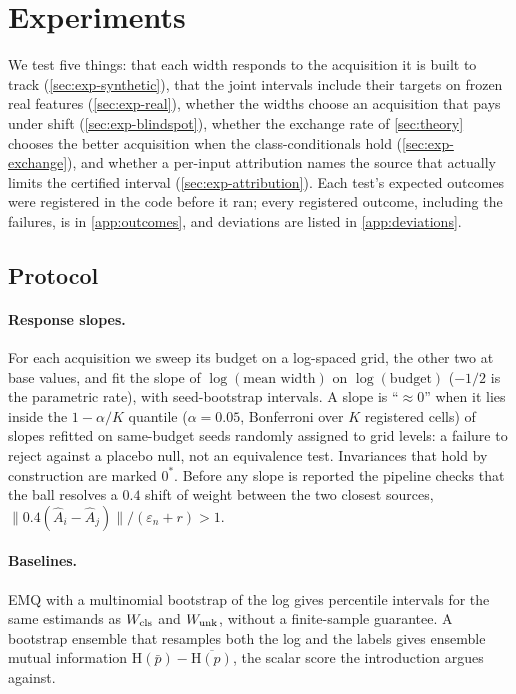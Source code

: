 \section{Experiments}
\label{sec:experiments}

We test five things: that each width responds to the acquisition it is built to track
(\cref{sec:exp-synthetic}), that the joint intervals include their targets on frozen real features
(\cref{sec:exp-real}), whether the widths choose an acquisition that pays under shift
(\cref{sec:exp-blindspot}), whether the exchange rate of \cref{sec:theory} chooses the better
acquisition when the class-conditionals hold (\cref{sec:exp-exchange}), and whether a per-input
attribution names the source that actually limits the certified interval (\cref{sec:exp-attribution}).
Each test's expected outcomes were registered in the code before it ran; every registered outcome,
including the failures, is in \cref{app:outcomes}, and deviations are listed in \cref{app:deviations}.

\subsection{Protocol}
\label{sec:exp-protocol}

\paragraph{Response slopes.} For each acquisition we sweep its budget on a log-spaced grid, the other two at
base values, and fit the slope of $\log(\text{mean width})$ on $\log(\text{budget})$ ($-1/2$ is the parametric
rate), with seed-bootstrap intervals. A slope is ``$\approx0$'' when it lies inside the $1-\alpha/K$ quantile
($\alpha=0.05$, Bonferroni over $K$ registered cells) of slopes refitted on same-budget seeds randomly assigned to
grid levels: a failure to reject against a placebo null, not an equivalence test. Invariances that hold by
construction are marked $0^{\ast}$. Before any slope is reported the pipeline checks that the ball resolves a
$0.4$ shift of weight between the two closest sources, $\lVert0.4(\hat A_i-\hat A_j)\rVert/(\varepsilon_n+r)>1$.

\paragraph{Baselines.} EMQ \citep{saerens2002adjusting} with a multinomial bootstrap of the log gives
percentile intervals for the same estimands as $W_{\mathrm{cls}}$ and $W_{\mathrm{unk}}$, without a finite-sample guarantee.
A bootstrap ensemble that resamples both the log and the labels gives ensemble mutual information
$\mathrm H(\bar p)-\overline{\mathrm H(p)}$, the scalar score the introduction argues against.


